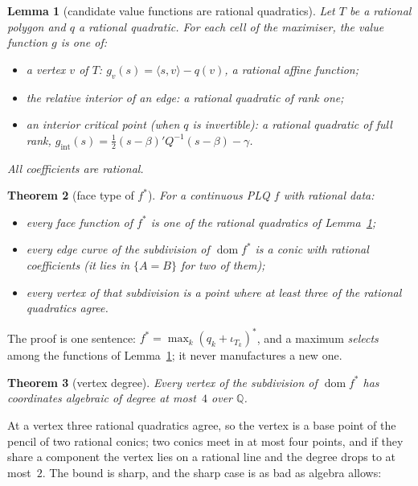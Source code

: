 \documentclass[11pt]{article}
\newtheorem{theorem}{Theorem}
\newtheorem{lemma}[theorem]{Lemma}
\theoremstyle{definition}
\newcommand{\Q}{\mathbb{Q}}
\DeclareMathOperator{\dom}{dom}
\begin{document}
\begin{lemma}[candidate value functions are rational quadratics]\label{lem:candidate}
Let $T$ be a rational polygon and $q$ a rational quadratic. For each cell of the
maximiser, the value function $g$ is one of:
\begin{itemize}[nosep,leftmargin=*]
\item a vertex $v$ of $T$: $g_v(s)=\langle s,v\rangle-q(v)$, a rational
  \emph{affine} function;
\item the relative interior of an edge: a rational quadratic of
  \emph{rank one};
\item an interior critical point (when $q$ is invertible): a rational quadratic
  of full rank,
  $g_{\mathrm{int}}(s)=\tfrac12(s-\beta)'Q^{-1}(s-\beta)-\gamma$.
\end{itemize}
All coefficients are rational.
\end{lemma}

\begin{theorem}[face type of $f^*$]\label{thm:conjface}
For a continuous PLQ $f$ with rational data:
\begin{itemize}[nosep,leftmargin=*]
\item every \emph{face function} of $f^*$ is one of the rational quadratics of
  Lemma~\ref{lem:candidate};
\item every \emph{edge curve} of the subdivision of $\dom f^*$ is a conic with
  rational coefficients (it lies in $\{A=B\}$ for two of them);
\item every \emph{vertex} of that subdivision is a point where at least three
  of the rational quadratics agree.
\end{itemize}
\end{theorem}

The proof is one sentence: $f^* = \max_k (q_k+\iota_{T_k})^*$, and a maximum
\emph{selects} among the functions of Lemma~\ref{lem:candidate}; it never
manufactures a new one.

\begin{theorem}[vertex degree]\label{thm:deg4}
Every vertex of the subdivision of $\dom f^*$ has coordinates algebraic of
degree at most~$4$ over $\Q$.
\end{theorem}

At a vertex three rational quadratics agree, so the vertex is a base point of
the pencil of two rational conics; two conics meet in at most four points, and
if they share a component the vertex lies on a rational line and the degree
drops to at most~$2$.
 The bound is
sharp, and the sharp case is as bad as algebra allows:
\end{document}
